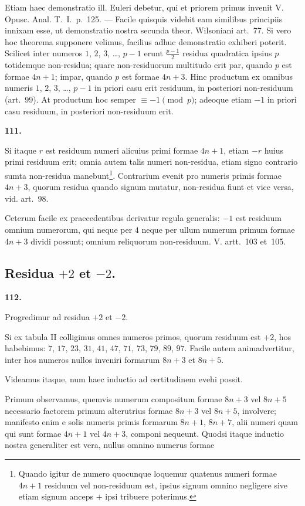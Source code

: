 \documentclass[12pt,a4paper]{article}
\theoremstyle{plain}
\theoremstyle{definition}
\theoremstyle{remark}
\begin{document}
Etiam haec demonstratio ill. Euleri debetur, qui et priorem primus invenit V. Opusc. Anal. T.~I.~p.~125. --- Facile quisquis videbit eam similibus principiis innixam esse, ut demonstratio nostra secunda theor. Wilsoniani art.~77. Si vero hoc theorema supponere velimus, facilius adhuc demonstratio exhiberi poterit. Scilicet inter numeros $1$, $2$, $3$, \ldots, $p-1$ erunt $\frac{p-1}{2}$ residua quadratica ipsius $p$ totidemque non-residua; quare non-residuorum multitudo erit par, quando $p$ est formae $4n+1$; impar, quando $p$ est formae $4n+3$. Hinc productum ex omnibus numeris $1$, $2$, $3$, \ldots, $p-1$ in priori casu erit residuum, in posteriori non-residuum (art.~99). At productum hoc semper $\equiv -1 \pmod{p}$; adeoque etiam $-1$ in priori casu residuum, in posteriori non-residuum erit.

\setcounter{satz}{111}
\addtocounter{satz}{-1}
\textbf{111.}

Si itaque $r$ est residuum numeri alicuius primi formae $4n+1$, etiam $-r$ huius primi residuum erit; omnia autem talis numeri non-residua, etiam signo contrario sumta non-residua manebunt\footnote{Quando igitur de numero quocunque loquemur quatenus numeri formae $4n+1$ residuum vel non-residuum est, ipsius signum omnino negligere sive etiam signum anceps $+$ ipsi tribuere poterimus.}. Contrarium evenit pro numeris primis formae $4n+3$, quorum residua quando signum mutatur, non-residua fiunt et vice versa, vid. art.~98.

Ceterum facile ex praecedentibus derivatur regula generalis: $-1$ est residuum omnium numerorum, qui neque per $4$ neque per ullum numerum primum formae $4n+3$ dividi possunt; omnium reliquorum non-residuum. V. artt.~103 et~105.

\subsection*{Residua $+2$ et $-2$.}

\setcounter{satz}{112}
\addtocounter{satz}{-1}
\textbf{112.}

Progredimur ad residua $+2$ et $-2$.

Si ex tabula II colligimus omnes numeros primos, quorum residuum est $+2$, hos habebimus: $7$, $17$, $23$, $31$, $41$, $47$, $71$, $73$, $79$, $89$, $97$. Facile autem animadvertitur, inter hos numeros nullos inveniri formarum $8n+3$ et $8n+5$.

Videamus itaque, num haec inductio ad certitudinem evehi possit.

Primum observamus, quemvis numerum compositum formae $8n+3$ vel $8n+5$ necessario factorem primum alterutrius formae $8n+3$ vel $8n+5$, involvere; manifesto enim e solis numeris primis formarum $8n+1$, $8n+7$, alii numeri quam qui sunt formae $4n+1$ vel $4n+3$, componi nequeunt. Quodsi itaque inductio nostra generaliter est vera, nullus omnino numerus formae
\end{document}
